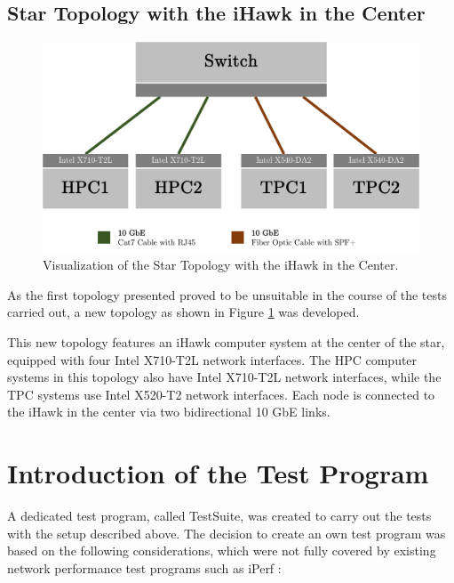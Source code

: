 \subsection{Star Topology with the iHawk in the Center} \label{chap:TopoiHawk}

\begin{figure}[h!]
    \centering
    \includegraphics[width=1\linewidth]{figures/method/topo3.pdf}
    \caption[Visualization of the Star Topology with the iHawk in the Center]{Visualization of the Star Topology with the iHawk in the Center.}
    \label{fig:startopoIHawk}
\end{figure}

As the first topology presented proved to be unsuitable in the course of the tests carried out, a new topology as shown in Figure \ref{fig:startopoIHawk} was developed.

This new topology features an iHawk computer system at the center of the star, equipped with four Intel X710-T2L network interfaces. The HPC computer systems in this topology also have Intel X710-T2L network interfaces, while the TPC systems use Intel X520-T2 network interfaces. Each node is connected to the iHawk in the center via two bidirectional 10 GbE links.


\section{Introduction of the Test Program} \label{chap:TestSuite}
A dedicated test program, called TestSuite, was created to carry out the tests with the setup described above. The decision to create an own test program was based on the following considerations, which were not fully covered by existing network performance test programs such as iPerf \cite{testsuite01}:

